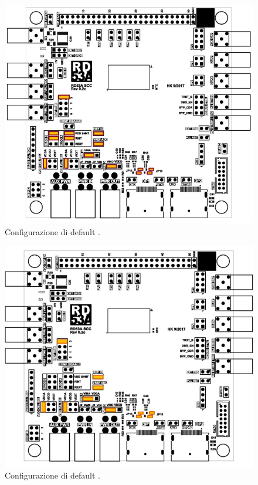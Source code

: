 \begin{figure}
\centering
\includegraphics[scale=.3]{Immagini/SLDOmode}
\caption{Configurazione di default .}
\label{SLDOmode}
\end{figure}
\begin{figure}
\centering
\includegraphics[scale=.3]{Immagini/LDOmodeDefault}
\caption{Configurazione di default .}
\label{LDOmodeDefault}
\end{figure}
